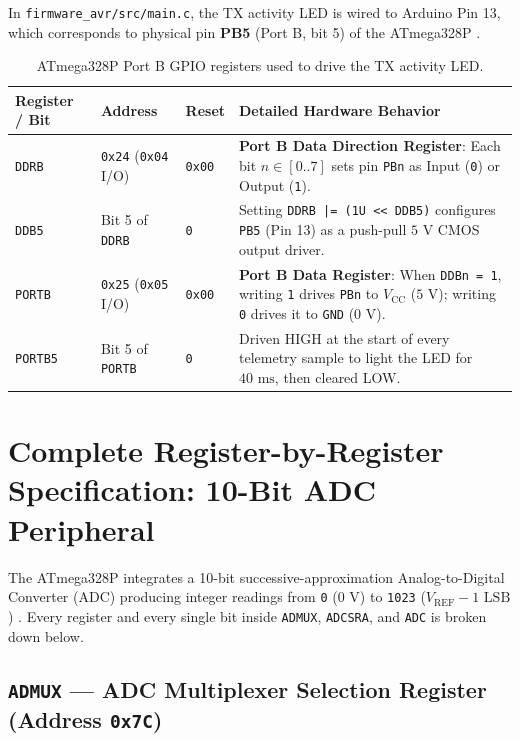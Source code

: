 \documentclass[11pt,a4paper,oneside]{report}
\begin{document}
In \texttt{firmware\_avr/src/main.c}, the TX activity LED is wired to Arduino Pin 13, which corresponds to physical pin \textbf{PB5} (Port B, bit 5) of the ATmega328P \cite{microchip_328p}.

\begin{table}[!htbp]
\centering
\caption{ATmega328P Port B GPIO registers used to drive the TX activity LED.}
\label{tab:ch3_gpio}
\begin{tabularx}{\linewidth}{l l l X}
\toprule
\textbf{Register / Bit} & \textbf{Address} & \textbf{Reset} & \textbf{Detailed Hardware Behavior} \\
\midrule
\texttt{DDRB} & \texttt{0x24} (\texttt{0x04} I/O) & \texttt{0x00} & \textbf{Port B Data Direction Register}: Each bit $n \in [0..7]$ sets pin \texttt{PBn} as Input (\texttt{0}) or Output (\texttt{1}). \\
\texttt{DDB5} & Bit 5 of \texttt{DDRB} & \texttt{0} & Setting \texttt{DDRB |= (1U << DDB5)} configures \texttt{PB5} (Pin 13) as a push-pull $5\text{ V}$ CMOS output driver. \\
\texttt{PORTB} & \texttt{0x25} (\texttt{0x05} I/O) & \texttt{0x00} & \textbf{Port B Data Register}: When \texttt{DDBn = 1}, writing \texttt{1} drives \texttt{PBn} to $V_{\text{CC}}$ ($5\text{ V}$); writing \texttt{0} drives it to \texttt{GND} ($0\text{ V}$). \\
\texttt{PORTB5} & Bit 5 of \texttt{PORTB} & \texttt{0} & Driven HIGH at the start of every telemetry sample to light the LED for $40\text{ ms}$, then cleared LOW. \\
\bottomrule
\end{tabularx}
\end{table}

\section{Complete Register-by-Register Specification: 10-Bit ADC Peripheral}

The ATmega328P integrates a 10-bit successive-approximation Analog-to-Digital Converter (ADC) producing integer readings from \texttt{0} ($0\text{ V}$) to \texttt{1023} ($V_{\text{REF}} - 1\text{ LSB}$) \cite{microchip_328p}. Every register and every single bit inside \texttt{ADMUX}, \texttt{ADCSRA}, and \texttt{ADC} is broken down below.

\subsection{\texttt{ADMUX} --- ADC Multiplexer Selection Register (Address \texttt{0x7C})}
\end{document}
